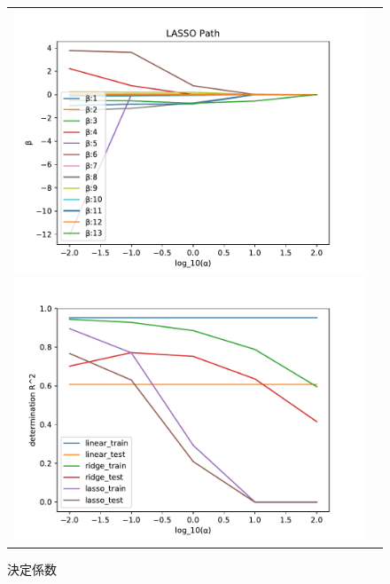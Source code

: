 \documentclass[a4paper,twocolumn]{ujarticle} %
\begin{document}
\begin{figure}[H]
    \begin{tabular}{cc}
    	 \begin{minipage}{0.5\hsize}
       		 \includegraphics[width=1.0\linewidth]{../img/lassoPath.pdf}
    		 \caption{Lassoの解パス}
    		 \label{fig:lasso}
    	 \end{minipage}
	  \begin{minipage}{0.5\hsize}
                	\includegraphics[width=1.0\linewidth]{../img/score.pdf}
                	\caption{決定係数}
               	\label{fig:score}
    	 \end{minipage}
	\end{tabular}
\end{figure}
\end{document}
